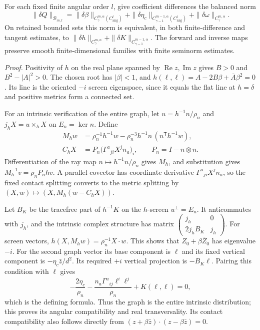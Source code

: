 \documentclass[
  english,
  11pt,
  reqno]{amsart}
\begin{document}
For each fixed finite angular order \(l\), give coefficient differences
the balanced norm%
 \[
\|\delta Q\|_{\mathcal B_{m,l}}
=\|\delta\beta\|_{C^{m,\alpha}_\gamma(C^l_{\mathrm{ang}})}
+\|\delta\eta_c\|_{C^{m-1,\alpha}_{\gamma-1}(C^l_{\mathrm{ang}})}
+\|\delta\omega\|_{C^{m,\alpha}_\gamma}.
\] On retained bounded sets this norm is equivalent, in both
finite-difference and tangent estimates, to
\(\|\delta h\|_{C^{m,\alpha}_\gamma}+\|\delta K\|_{C^{m-1,\alpha}_{\gamma-1}}\).
The forward and inverse maps preserve smooth finite-dimensional families
with finite seminorm estimates.

\emph{Proof.} Positivity of \(h\) on the real plane spanned by
\(\operatorname{Re}z,\operatorname{Im}z\) gives \(B>0\) and
\(B^2-|A|^2>0\). The chosen root has \(|\beta|<1\), and
\(h(\ell,\ell)=A-2B\beta+\bar A\beta^2=0\). Its line is the oriented
\(-i\) screen eigenspace, since it equals the flat line at \(h=\delta\)
and positive metrics form a connected set.

For an intrinsic verification of the entire graph, let
\(u=h^{-1}n/\rho_n\) and \(j_hX=u\times_hX\) on \(E_n=\ker n\). Define
\[
\begin{aligned}
M_hw&=\rho_n^{-1}h^{-1}w
-\rho_n^{-3}h^{-1}n\,(n^{\mathsf T}h^{-1}w),\\
C_hX&=P_n\bigl(\Gamma^a{}_{ji}X^jn_a\bigr)_i,
\qquad P_n=I-n\otimes n.
\end{aligned}
\] Differentiation of the ray map \(n\mapsto h^{-1}n/\rho_n\) gives
\(M_h\), and substitution gives \(M_h^{-1}v=\rho_nP_nhv\). A parallel
covector has coordinate derivative \(\Gamma^a{}_{ji}X^jn_a\), so the
fixed contact splitting converts to the metric splitting by
\((X,w)\mapsto(X,M_h(w-C_hX))\).

Let \(B_K\) be the tracefree part of \(h^{-1}K\) on the \(h\)-screen
\(u^\perp=E_n\). It anticommutes with \(j_h\), and the intrinsic complex
structure has matrix
\(\left(\begin{smallmatrix}j_h&0\\2j_hB_K&j_h\end{smallmatrix}\right)\).
For screen vectors, \(h(X,M_hw)=\rho_n^{-1}X\cdot w\). This shows that
\(Z_0+\beta\bar Z_0\) has eigenvalue \(-i\). For the second graph vector
its base component is \(\ell\) and its fixed vertical component is
\(-\eta_c\bar z/d^2\). Its required \(+i\) vertical projection is
\(-B_K\ell\). Pairing this condition with \(\ell\) gives \[
-\frac{2\eta_c}{\rho_n}
-\frac{n_a\Gamma^a{}_{ij}\ell^i\ell^j}{\rho_n}
+K(\ell,\ell)=0,
\] which is the defining formula. Thus the graph is the entire intrinsic
distribution; this proves its angular compatibility and real
transversality. Its contact compatibility also follows directly from
\((z+\beta\bar z)\cdot(z-\beta\bar z)=0\).
\end{document}
